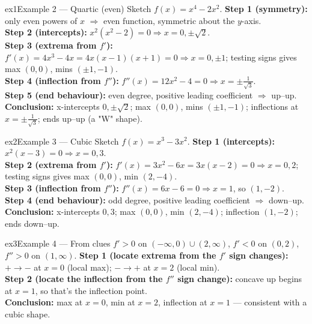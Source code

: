 \documentclass[11pt]{article}
\begin{document}
\begin{example}{ex1}{Example 2 --- Quartic (even)}
Sketch $f(x)=x^4-2x^2$.\soln
\textbf{Step 1 (symmetry):} only even powers of $x$ $\Rightarrow$ even function, symmetric about the $y$-axis.\\[3pt]
\textbf{Step 2 (intercepts):} $x^2(x^2-2)=0\Rightarrow x=0,\pm\sqrt2$.\\[3pt]
\textbf{Step 3 (extrema from $f'$):} $f'(x)=4x^3-4x=4x(x-1)(x+1)=0\Rightarrow x=0,\pm1$; testing signs gives max $(0,0)$, mins $(\pm1,-1)$.\\[3pt]
\textbf{Step 4 (inflection from $f''$):} $f''(x)=12x^2-4=0\Rightarrow x=\pm\tfrac1{\sqrt3}$.\\[3pt]
\textbf{Step 5 (end behaviour):} even degree, positive leading coefficient $\Rightarrow$ up--up.\\[3pt]
\textbf{Conclusion:} x-intercepts $0,\pm\sqrt2$; max $(0,0)$, mins $(\pm1,-1)$; inflections at $x=\pm\tfrac1{\sqrt3}$; ends up--up (a "W" shape).
\end{example}

\begin{example}{ex2}{Example 3 --- Cubic}
Sketch $f(x)=x^3-3x^2$.\soln
\textbf{Step 1 (intercepts):} $x^2(x-3)=0\Rightarrow x=0,3$.\\[3pt]
\textbf{Step 2 (extrema from $f'$):} $f'(x)=3x^2-6x=3x(x-2)=0\Rightarrow x=0,2$; testing signs gives max $(0,0)$, min $(2,-4)$.\\[3pt]
\textbf{Step 3 (inflection from $f''$):} $f''(x)=6x-6=0\Rightarrow x=1$, so $(1,-2)$.\\[3pt]
\textbf{Step 4 (end behaviour):} odd degree, positive leading coefficient $\Rightarrow$ down--up.\\[3pt]
\textbf{Conclusion:} x-intercepts $0,3$; max $(0,0)$, min $(2,-4)$; inflection $(1,-2)$; ends down--up.
\end{example}

\begin{example}{ex3}{Example 4 --- From clues}
$f'>0$ on $(-\infty,0)\cup(2,\infty)$, $f'<0$ on $(0,2)$, $f''>0$ on $(1,\infty)$.\soln
\textbf{Step 1 (locate extrema from the $f'$ sign changes):} $+\to-$ at $x=0$ (local max); $-\to+$ at $x=2$ (local min).\\[3pt]
\textbf{Step 2 (locate the inflection from the $f''$ sign change):} concave up begins at $x=1$, so that's the inflection point.\\[3pt]
\textbf{Conclusion:} max at $x=0$, min at $x=2$, inflection at $x=1$ --- consistent with a cubic shape.
\end{example}
\end{document}
